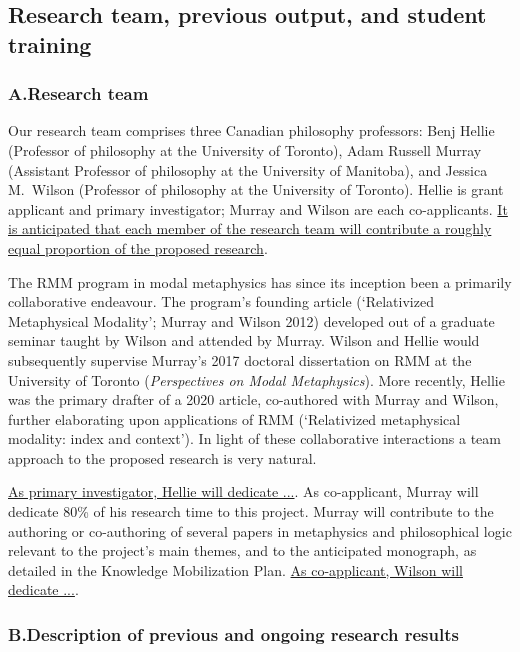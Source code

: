 \documentclass[12pt]{article}
\begin{document}
\subsection*{Research team, previous output, and student training}

\subsubsection*{A.\quad Research team}

Our research team comprises three Canadian philosophy professors: Benj Hellie
(Professor of philosophy at the University of Toronto), Adam Russell Murray
(Assistant Professor of philosophy at the University of Manitoba), and Jessica
M.\ Wilson (Professor of philosophy at the University of Toronto). Hellie is
grant applicant and primary investigator; Murray and Wilson are each
co-applicants.  \ul{It is anticipated that each member of the research team will
contribute a roughly equal proportion of the proposed research}. 

The RMM program in modal metaphysics has since its inception been a primarily
collaborative endeavour. The program's founding article (`Relativized
Metaphysical Modality'; Murray and Wilson 2012) developed out of a graduate
seminar taught by Wilson and attended by Murray. Wilson and Hellie would
subsequently supervise Murray's 2017 doctoral dissertation on RMM at the
University of Toronto (\emph{Perspectives on Modal Metaphysics}). More
recently, Hellie was the primary drafter of a 2020 article, co-authored with
Murray and Wilson, further elaborating
upon applications of RMM (`Relativized metaphysical modality: index and
context'). In light of these
collaborative interactions a team approach to the proposed research is very
natural.  

\ul{As primary investigator, Hellie will dedicate ...}. 
As co-applicant, Murray will dedicate 80\% of his research time to this
project. Murray will contribute to the authoring or co-authoring of several
papers in metaphysics and philosophical logic relevant to the project's main
themes, and to the anticipated monograph, as detailed in the Knowledge
Mobilization Plan. \ul{As co-applicant, Wilson will dedicate ...}. 


\subsubsection*{B.\quad Description of previous and ongoing research results}
\end{document}
